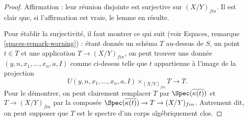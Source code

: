 \begin{proof}
\medskip\noindent
Affirmation : leur réunion disjointe est surjective sur $(X/Y)_{fin}$.
Il est clair que, si l'affirmation est vraie, le lemme en résulte.

\medskip\noindent
Pour établir la surjectivité, il faut montrer ce qui suit (voir
Espaces, remarque \ref{spaces-remark-warning}) : étant donnés un schéma $T$ au-dessus de
$S$, un point $t \in T$ et une application $T \to (X/Y)_{fin}$, on peut trouver une donnée
$(y, n, x_1, \ldots, x_n, a, I)$ comme ci-dessus telle que
$t$ appartienne à l'image de la projection
$$
U(y, n, x_1, \ldots, x_n, a, I) \times_{(X/Y)_{fin}} T \longrightarrow T.
$$
Pour le démontrer, on peut clairement remplacer $T$ par
$\Spec(\overline{\kappa(t)})$ et
$T \to (X/Y)_{fin}$ par la composée
$\Spec(\overline{\kappa(t)}) \to T \to (X/Y)_{fin}$.
Autrement dit, on peut supposer que $T$ est
le spectre d'un corps algébriquement clos.


\end{proof}
